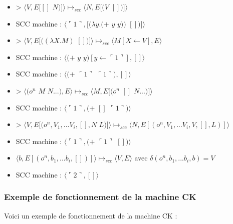\documentclass[10pt,a4paper]{article}
\begin{document}
\begin{itemize}
						\item[] >  $\langle V,E[[]$ $N)]\rangle \longmapsto_{scc} \langle N,E[(V$ $[])]\rangle$
						\item[] SCC machine : $\langle\ulcorner 1\urcorner,[(\lambda y.(+$ $y$ $y))$ $[])]\rangle$
						\item[] > $\langle V,E[((\lambda X.M)$ $[])]\rangle \longmapsto_{scc} \langle M[X\leftarrow V],E\rangle$
						\item[] SCC machine : $\langle(+$ $y$ $y)[y \leftarrow \ulcorner 1\urcorner],[]\rangle$	
						\item[] SCC machine : $\langle(+$ $\ulcorner 1\urcorner$ $\ulcorner 1\urcorner),[]\rangle$	
						\item[] > $\langle(o^{n}$ $M$ $N...),E\rangle \longmapsto_{scc} \langle M,E[(o^{n}$ $[]$ $N...)]\rangle$
						\item[] SCC machine : $\langle\ulcorner 1\urcorner,(+$ $[]$ $\ulcorner 1\urcorner)\rangle$	
						\item[] > $\langle V,E[(o^{n},V_{1},...V_{i},[],N$ $L)]\rangle \longmapsto_{scc} \langle N,E[(o^{n},V_{1},...V_{i},V,[],L)]\rangle$
						\item[] SCC machine : $\langle\ulcorner 1\urcorner,(+$ $\ulcorner 1\urcorner$ $[])\rangle$	
						\item[] $\langle b,E[(o^{n},b_{1},...b_{i},[])]\rangle \longmapsto_{scc} \langle V,E\rangle$ avec $\delta (o^{n},b_{1},...b_{i},b)=V$ 
						\item[] SCC machine : $\langle\ulcorner 2\urcorner,[]\rangle$	
					\end{itemize}
				\newpage
				\subsubsection{Exemple de fonctionnement de la machine CK}\label{CK}
				
					Voici un exemple de fonctionnement de la machine CK :
					
\end{document}
